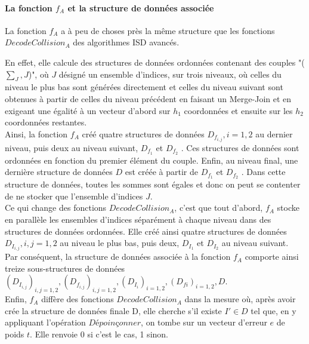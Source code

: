 \documentclass[12pt,openany]{report}
\begin{document}
\paragraph{La fonction $f_A$ et la structure de données associée}
 La fonction $f_A$ a à
peu de choses près la même structure que les fonctions $DecodeCollision_A$ des
algorithmes ISD avancés.


En effet, elle calcule des structures de données ordonnées contenant des couples
"($\sum_{J},J  $)", où $J$  désigné un ensemble d’indices, sur trois niveaux, où celles du
niveau le plus bas sont générées directement et celles du niveau suivant sont
obtenues à partir de celles du niveau précédent en faisant un Merge-Join et
en exigeant une égalité à un vecteur d’abord sur $h_1$ coordonnées et ensuite sur
les $h_2$ coordonnées restantes.\\
Ainsi, la fonction $f_A$ créé quatre structures de données $D_{f_{i,j}}, i = 1, 2$ au dernier
niveau, puis deux au niveau suivant, $D_{f_1}$
et $D_{f_2}$
. Ces structures de données sont
ordonnées en fonction du premier élément du couple. Enfin, au niveau final, une
dernière structure de données $D$ est créée à partir de $D_{f_1}$
et $D_{f_2}$
. Dans cette
structure de données, toutes les sommes sont égales et donc on peut se contenter
de ne stocker que l’ensemble d’indices $J$.\\

Ce qui change des fonctions $DecodeCollision_A$, c’est que tout d’abord, $f_A$
stocke en parallèle les ensembles d’indices séparément à chaque niveau dans des
structures de données ordonnées. Elle créé ainsi quatre structures de données
$D_{I_{i,j}} , i, j = 1, 2$ au niveau le plus bas, puis deux, $D_{I_1}$
et $D_{I_2}$
au niveau suivant.\\
Par conséquent, la structure de données associée à la fonction $f_A$ comporte ainsi
treize sous-structures de données $(D_{I_{i,j}} )_{i,j=1,2},(D_{f_{i,j}} )_{i,j=1,2},(D_{I_i}
)_{i=1,2},(D_{fi
})_{i=1,2}, D$.\\
Enfin, $f_A$ diffère des fonctions $DecodeCollision_A$ dans la mesure où, après avoir
crée la structure de données finale D, elle cherche s’il existe $I' \in D $ tel que, en
y appliquant l’opération $Dépoinçonner$, on tombe sur un vecteur d’erreur $e$ de
poids $t$. Elle renvoie $0$ si c’est le cas, 1 sinon.\\
\end{document}
